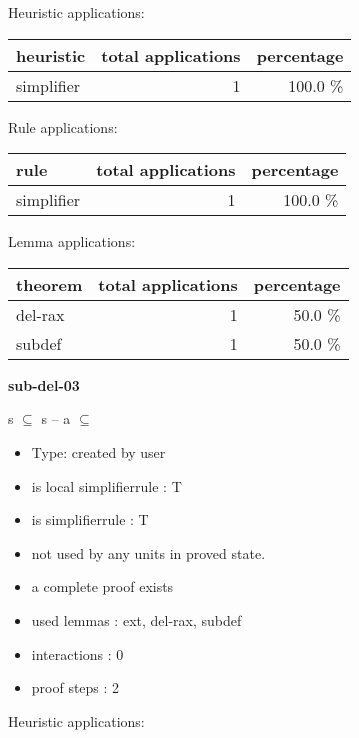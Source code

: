 \documentclass[a4paper]{article}
\begin{document}
\medskip


Heuristic applications:

\begin{supertabular}{l|r|r}
heuristic	& total applications & percentage \\ \hline
simplifier & 1 & 100.0 \% \\

\end{supertabular}

Rule applications:

\begin{supertabular}{l|r|r}
rule	        & total applications & percentage \\ \hline
simplifier & 1 & 100.0 \% \\

\end{supertabular}

Lemma applications:

\begin{supertabular}{l|r|r}
theorem	        & total applications & percentage \\ \hline
del-rax & 1 & 50.0 \% \\
subdef & 1 & 50.0 \% \\

\end{supertabular}
\pagebreak

{\LARGE\bf sub-del-03}\label{lemma-sub-del-03}

\medskip

 \Fol s $\subseteq$  \Imp s -- a $\subseteq$ 

\begin{itemize}

\item Type: created by user

\item is local simplifierrule : T
\item is simplifierrule : T
\item not used by any units in proved state.
\item       a complete proof exists
\item       used lemmas  : ext, del-rax, subdef
\item       interactions : 0
\item       proof steps  : 2
\end{itemize}

\medskip


Heuristic applications:
\end{document}
